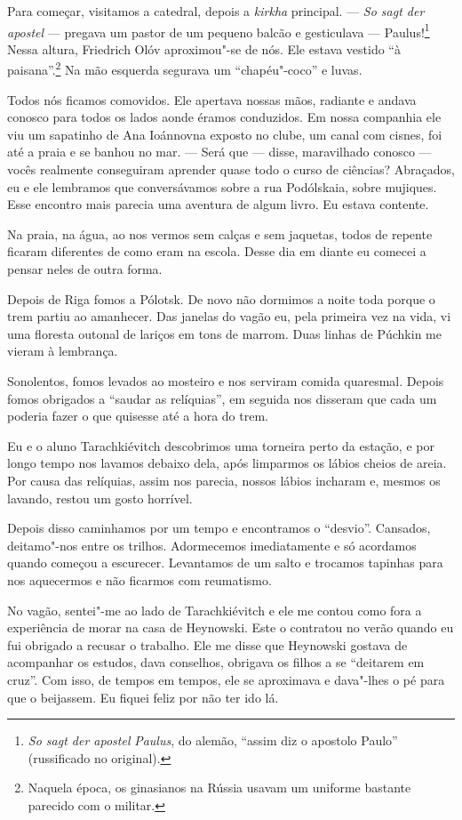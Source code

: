 Para começar, visitamos a catedral, depois a \emph{kirkha} principal.
--- \emph{So sagt der apostel} --- pregava um pastor de um pequeno
balcão e gesticulava --- Paulus!\footnote{\emph{So sagt der apostel}
  \emph{Paulus}, do alemão, ``assim diz o apostolo Paulo'' (russificado
  no original).} Nessa altura, Friedrich Olóv aproximou"-se de nós. Ele
estava vestido ``à paisana''.\footnote{Naquela época, os ginasianos na
  Rússia usavam um uniforme bastante parecido com o militar.} Na mão
esquerda segurava um ``chapéu"-coco'' e luvas.

Todos nós ficamos comovidos. Ele apertava nossas mãos, radiante e andava
conosco para todos os lados aonde éramos conduzidos. Em nossa companhia
ele viu um sapatinho de Ana Ioánnovna exposto no clube, um canal com
cisnes, foi até a praia e se banhou no mar. --- Será que --- disse,
maravilhado conosco --- vocês realmente conseguiram aprender quase todo
o curso de ciências? Abraçados, eu e ele lembramos que conversávamos
sobre a rua Podólskaia, sobre mujiques. Esse encontro mais parecia uma
aventura de algum livro. Eu estava contente.

Na praia, na água, ao nos vermos sem calças e sem jaquetas, todos de
repente ficaram diferentes de como eram na escola. Desse dia em diante
eu comecei a pensar neles de outra forma.

Depois de Riga fomos a Pólotsk. De novo não dormimos a noite toda porque
o trem partiu ao amanhecer. Das janelas do vagão eu, pela primeira vez
na vida, vi uma floresta outonal de lariços em tons de marrom. Duas
linhas de Púchkin me vieram à lembrança.

Sonolentos, fomos levados ao mosteiro e nos serviram comida quaresmal.
Depois fomos obrigados a ``saudar as relíquias'', em seguida nos
disseram que cada um poderia fazer o que quisesse até a hora do trem.

Eu e o aluno Tarachkiévitch descobrimos uma torneira perto da estação, e
por longo tempo nos lavamos debaixo dela, após limparmos os lábios
cheios de areia. Por causa das relíquias, assim nos parecia, nossos
lábios incharam e, mesmos os lavando, restou um gosto horrível.

Depois disso caminhamos por um tempo e encontramos o ``desvio''.
Cansados, deitamo"-nos entre os trilhos. Adormecemos imediatamente e só
acordamos quando começou a escurecer. Levantamos de um salto e trocamos
tapinhas para nos aquecermos e não ficarmos com reumatismo.

No vagão, sentei"-me ao lado de Tarachkiévitch e ele me contou como fora
a experiência de morar na casa de Heynowski. Este o contratou no verão
quando eu fui obrigado a recusar o trabalho. Ele me disse que Heynowski
gostava de acompanhar os estudos, dava conselhos, obrigava os filhos a
se ``deitarem em cruz''. Com isso, de tempos em tempos, ele se
aproximava e dava"-lhes o pé para que o beijassem. Eu fiquei feliz por
não ter ido lá.

